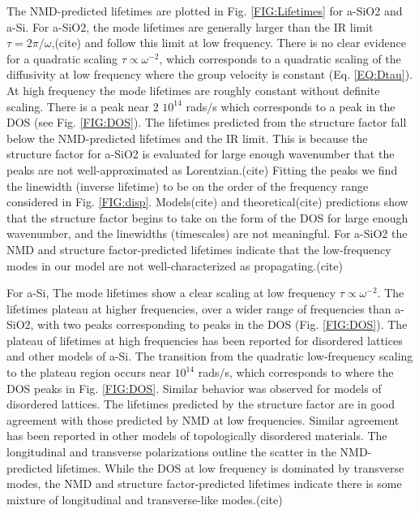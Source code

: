 \documentclass[aps,prb,onecolumn,preprint,superscriptaddress,footinbib,amsmath,amssymb,floatfix]{revtex4}
\begin{document}
The NMD-predicted lifetimes are plotted in Fig. \ref{FIG:Lifetimes} 
for a-SiO2 and a-Si. 
For a-SiO2, the mode lifetimes are generally larger than 
the IR limit $\tau = 2\pi/\omega$,(cite) and follow 
this limit at low frequency. There is no clear evidence for a
quadratic scaling $\tau\propto\omega^{-2}$, which 
corresponds to a quadratic scaling of the diffusivity at low 
frequency where the group velocity is constant 
(Eq. \eqref{EQ:Dtau}). 
At high frequency the mode lifetimes are roughly constant 
without definite scaling. There is a peak near 
2 $10^{14}$ rads$/$s which corresponds to a peak in the DOS 
(see Fig. \ref{FIG:DOS}).  The lifetimes predicted from the 
structure factor fall below the NMD-predicted lifetimes 
and the IR limit. This is because the structure factor for 
a-SiO2 is evaluated for large enough wavenumber that the 
peaks are not well-approximated as Lorentzian.(cite) Fitting 
the peaks we find the linewidth (inverse lifetime) 
to be on the order of the frequency range considered in 
Fig. \ref{FIG:disp}. 
Models(cite) and theoretical(cite) predictions show that the 
structure factor begins to take on the form of the DOS 
for large enough wavenumber,
\cite{martin-mayor_dynamical_2001,baldi_thermal_2008} and the 
linewidths (timescales) are not meaningful. For a-SiO2 the NMD and 
structure factor-predicted lifetimes indicate that the 
low-frequency modes 
in our model are not well-characterized as propagating.(cite)  

For a-Si, 
The mode lifetimes show a clear scaling at low frequency 
$\tau\propto\omega^{-2}$. The lifetimes plateau at higher frequencies,
over a wider range of frequencies than a-SiO2, with two peaks 
corresponding to peaks in the DOS (Fig. \ref{FIG:DOS}). The plateau of 
lifetimes at high frequencies has been 
reported for disordered lattices
\cite{sheng_heat_1991,larkin_predicting_2013} and 
other models of a-Si.\cite{he_heat_2011} 
The transition from the quadratic low-frequency scaling to 
the plateau region occurs near 
$10^{14}$ rads$/$s, which corresponds to where the DOS peaks in Fig. 
\ref{FIG:DOS}. 
Similar behavior was observed for models of disordered lattices.
\cite{larkin_predicting_2013} The lifetimes predicted by the 
structure factor are in good agreement with those predicted by NMD 
at low frequencies. Similar agreement has been reported in other 
models of topologically disordered materials.
\cite{mazzacurati_low-frequency_1996} 
The longitudinal and transverse polarizations 
outline the scatter in the NMD-predicted lifetimes. While the DOS 
at low frequency is 
dominated by transverse modes, the NMD and 
structure factor-predicted lifetimes indicate there 
is some mixture of longitudinal and transverse-like modes.(cite) 
\end{document}
